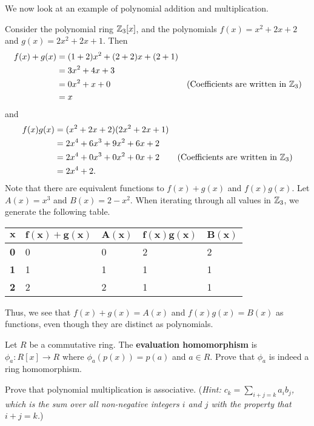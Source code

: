 We now look at an example of polynomial addition and multiplication.
\begin{example}
    Consider the polynomial ring $\mathbb{Z}_3[x]$, and the polynomials $f(x) = x^2 + 2x + 2$ and $g(x) = 2x^2 + 2x + 1$. Then
    \begin{align*}
        f(x) + g(x) &= (1+2)x^2 + (2+2)x + (2+1)\\
        &= 3x^2 + 4x + 3\\
        &= 0x^2 + x + 0 & (\text{Coefficients are written in }\mathbb{Z}_3)\\
        &= x
    \end{align*}
    and
    \begin{align*}
        f(x)g(x) &= (x^2+2x+2)(2x^2+2x+1)\\
        &= 2x^4 + 6x^3 + 9x^2 + 6x + 2\\
        &= 2x^4 + 0x^3 + 0x^2 + 0x + 2 & (\text{Coefficients are written in }\mathbb{Z}_3)\\
        &= 2x^4 + 2.
    \end{align*}
    Note that there are equivalent functions to $f(x)+g(x)$ and $f(x)g(x)$. Let $A(x) = x^3$ and $B(x) = 2-x^2$. When iterating through all values in $\mathbb{Z}_3$, we generate the following table.
    \begin{table}[H]
        \centering
        \begin{tabular}{|l|l|l|l|l|}
            \hline
            $\boldsymbol{x}$ & $\boldsymbol{f(x)+g(x)}$ & $\boldsymbol{A(x)}$ & $\boldsymbol{f(x)g(x)}$ & $\boldsymbol{B(x)}$ \\ \hline
            \textbf{0} & 0 & 0 & 2 & 2 \\ \hline
            \textbf{1} & 1 & 1 & 1 & 1 \\ \hline
            \textbf{2} & 2 & 2 & 1 & 1 \\ \hline
        \end{tabular}
    \end{table}
    Thus, we see that $f(x)+g(x) = A(x)$ and $f(x)g(x) = B(x)$ as functions, even though they are distinct as polynomials.
\end{example}

\begin{exercise}\label{exercise-polynomial-evaluation-is-ring-homomorphism}
    Let $R$ be a commutative ring. The \textbf{evaluation homomorphism} is $\phi_a: R[x] \to R$ where $\phi_a(p(x)) = p(a)$ and $a \in R$. Prove that $\phi_a$ is indeed a ring homomorphism.
\end{exercise}
\begin{exercise}\label{exercise-polynomial-multiplication-is-associative}
    Prove that polynomial multiplication is associative.\newline
    (\textit{Hint: $\displaystyle c_k = \sum_{i+j=k} a_ib_j$, which is the sum over all non-negative integers $i$ and $j$ with the property that $i+j=k$.})
\end{exercise}

